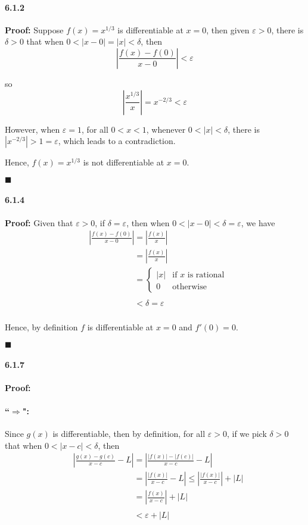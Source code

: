 \documentclass[11pt]{article}
\newcommand{\qed}{
	\begin{flushright}
		$\blacksquare$
	\end{flushright}}
\begin{document}
	\paragraph{6.1.2}\textbf{Proof:}
		Suppose $f(x) = x^{1/3}$ is differentiable at $x = 0$, then given $\varepsilon > 0$, there is $\delta > 0$ that when $0 < |x - 0| = |x| < \delta$, then
			\[\left|\frac{f(x) - f(0)}{x - 0}\right| < \varepsilon\]
			
		so
			\[\left|\frac{x^{1/3}}{x}\right| = x^{-2/3} < \varepsilon\]
			
		However, when $\varepsilon = 1$, for all $0 < x < 1$, whenever $0 < |x| < \delta$, there is $|x^{-2/3}| > 1 = \varepsilon$, which leads to a contradiction.
		
		Hence, $f(x) = x^{1/3}$ is not differentiable at $x = 0$.
		\qed
	\paragraph{6.1.4}\textbf{Proof:} Given that $\varepsilon > 0$, if $\delta = \varepsilon$, then when $0 < |x - 0| < \delta = \varepsilon$, we have
		\begin{align}
			&\left|\frac{f(x) - f(0)}{x - 0}\right| = \left|\frac{f(x)}{x}\right|\nonumber\\
			&\phantom{\left|\frac{f(x) - f(0)}{x - 0}\right|} = \left|\frac{f(x)}{x}\right|\nonumber\\
			&\phantom{\left|\frac{f(x) - f(0)}{x - 0}\right|} = \begin{cases}
				|x| &\text{if $x$ is rational}\\
				0 &\text{otherwise}
				\end{cases}\nonumber\\
			&\phantom{\left|\frac{f(x) - f(0)}{x - 0}\right|} < \delta = \varepsilon\nonumber
		\end{align}
		
		Hence, by definition $f$ is differentiable at $x = 0$ and $f'(0) = 0$.
		\qed
	\paragraph{6.1.7}\textbf{Proof:}
		\paragraph{``$\Rightarrow$":}
			Since $g(x)$ is differentiable, then by definition, for all $\varepsilon > 0$, if we pick $\delta > 0$ that when $0 < |x - c| < \delta$, then
			\begin{align}
				&\left|\frac{g(x) - g(c)}{x - c} - L\right| = \left|\frac{|f(x)| - |f(c)|}{x - c} - L\right|\nonumber\\
				&\phantom{\left|\frac{g(x) - g(c)}{x - c} - L\right|} = \left|\frac{|f(x)|}{x - c} - L\right| \leq \left|\frac{|f(x)|}{x - c}\right| + |L|\nonumber\\
				&\phantom{\left|\frac{g(x) - g(c)}{x - c} - L\right|} =\left|\frac{f(x)}{x - c}\right| + |L|\nonumber\\
				&\phantom{\left|\frac{g(x) - g(c)}{x - c} - L\right|} < \varepsilon + |L|\nonumber
			\end{align}
			
\end{document}
